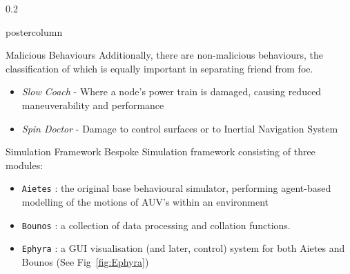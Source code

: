\documentclass[final,hyperref={pdfpagelabels=false}]{beamer}
\def\colwidth{0.2\linewidth}
\begin{document}
\begin{frame}[fragile]
\begin{columns}[T]
\begin{column}{\colwidth}
\begin{beamercolorbox}[center,wd=\textwidth]{postercolumn}
\begin{minipage}[T]{.98\textwidth}
{\begin{block}{Malicious Behaviours}
							Additionally, there are non-malicious behaviours, the classification of which is equally important in separating friend from foe.
							\begin{itemize}
								\item \emph{Slow Coach} - Where a node's power train is damaged, causing reduced maneuverability and performance
								\item \emph{Spin Doctor} - Damage to control surfaces or to Inertial Navigation System
							\end{itemize}
							
						\end{block}
						
						\begin{block}{Simulation Framework}
							Bespoke Simulation framework consisting of three modules:
							\begin{itemize}
								\item \texttt{Aietes} : the original base behavioural simulator, performing agent-based modelling of the motions of AUV's within an 
								environment
								\item \texttt{Bounos} : a collection of data processing and collation functions.
								\item \texttt{Ephyra} : a GUI visualisation (and later, control) system for both Aietes and Bounos (See Fig~\ref{fig:Ephyra})
							\end{itemize}
							
							\vspace{0.3\baselineskip}
							

\end{block}}
\end{minipage}
\end{beamercolorbox}
\end{column}
\end{columns}
\end{frame}
\end{document}

